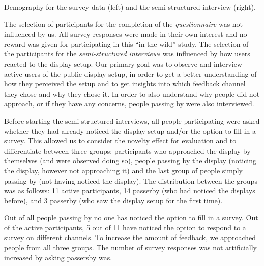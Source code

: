 		\begin{table}%
			\small
			\center
			

			\caption[Demographics of Field Study]{Demography for the survey data (left) and the semi-structured interview (right).}
			\label{table:demographics}
		\end{table}


		The selection of participants for the completion of the \textit{questionnaire} was not influenced by us. All survey responses were made in their own interest and no reward was given for participating in this ``in the wild''-study. The selection of the participants for the \textit{semi-structured interviews} was influenced by how users reacted to the display setup. Our primary goal was to observe and interview active users of the public display setup, in order to get a better understanding of how they perceived the setup and to get insights into which feedback channel they chose and why they chose it. In order to also understand why people did not approach, or if they have any concerns, people passing by were also interviewed. 
		
		Before starting the semi-structured interviews, all people participating were asked whether they had already noticed the display setup and/or the option to fill in a survey. 
		This allowed us to consider the novelty effect for evaluation and to differentiate between three groups: participants who approached the display by themselves (and were observed doing so), people passing by the display (noticing the display, however not approaching it) and the last group of people simply passing by (not having noticed the display). The distribution between the groups was as follows: 11 active participants, 14 passerby (who had noticed the displays before), and 3 passerby (who saw the display setup for the first time). 

		Out of all people passing by no one has noticed the option to fill in a survey. Out of the active participants, 5 out of 11 have noticed the option to respond to a survey on different channels.
		To increase the amount of feedback, we approached people from all three groups. The number of survey responses was not artificially increased by asking passersby was.
		






